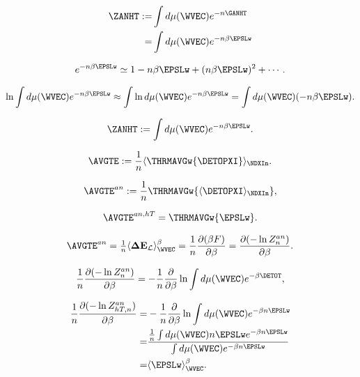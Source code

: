 \begin{align}
  \label{eqn:Zan}
 \ZANHT :=  &\int d\mu(\WVEC) e^{-n\GANHT} \\ \nonumber
  =  &\int d\mu(\WVEC) e^{-n\beta\EPSLw} 
\end{align}

\begin{align}
  e^{-n\beta\EPSLw} \simeq 1 - n\beta\EPSLw +  (n\beta\EPSLw)^{2} + \cdots  .
\end{align}

\begin{align}
  \ln\int d\mu(\WVEC)e^{-n\beta\EPSLw}\approx\int\ln d\mu(\WVEC)e^{-n\beta\EPSLw}=\int d\mu(\WVEC) (-n\beta\EPSLw)  .
 \end{align}

\begin{align}
  \label{eqn:ZanhT}
  \ZANHT :=
            \int d\mu(\WVEC) e^{-n\beta \EPSLw}   .       %
\end{align}

\begin{align}
  \label{eqn:avgte_def}
  \AVGTE:=\frac{1}{n}\langle\THRMAVGw{\DETOPXI}\rangle_{\NDXIn}  .
\end{align}

\begin{align}
  \label{eqn:avgte_an}
  \AVGTE^{an}  := \frac{1}{n}\THRMAVGw{\langle\DETOPXI\rangle_{\NDXIn}}   ,
\end{align}

\begin{align}
  \label{eqn:avgte_anhT}
  \AVGTE^{an, hT} = \THRMAVGw{\EPSLw}   .
\end{align}

\begin{align}
\label{eqn:avgte}
\AVGTE^{an} =
\tfrac{1}{n}\langle \mathbf{\Delta E}_{\mathcal{L}}\rangle_{\WVEC}^{\beta} =
\frac{1}{n}\dfrac{\partial (\beta F)}{\partial \beta}= \dfrac{\partial (-\ln Z^{an}_{n})}{\partial \beta}  .
\end{align}

\begin{align}
\label{eqn:avgte2}
\frac{1}{n}\dfrac{\partial (-\ln Z^{an}_{n})}{\partial \beta} = 
- \dfrac{1}{n}\dfrac{\partial}{\partial \beta}\ln\int d\mu(\WVEC)e^{-\beta \DETOT}  ,
\end{align}

\begin{align}
\label{eqn:avgte_anhT}
\frac{1}{n}\dfrac{\partial (-\ln Z^{an}_{hT,n})}{\partial \beta} 
   =& - \dfrac{1}{n}\dfrac{\partial}{\partial \beta}\ln\int d\mu(\WVEC)e^{-\beta n\EPSLw} \\ \nonumber
   =&  \dfrac{
              \tfrac{1}{n}  \int  d\mu(\WVEC) n\EPSLw e^{-\beta n\EPSLw} 
             }{
              \int  d\mu(\WVEC) e^{-\beta n\EPSLw} 
             } \\ \nonumber
   =& \langle\EPSLw \rangle_{\WVEC}^{\beta}  .
\end{align}

